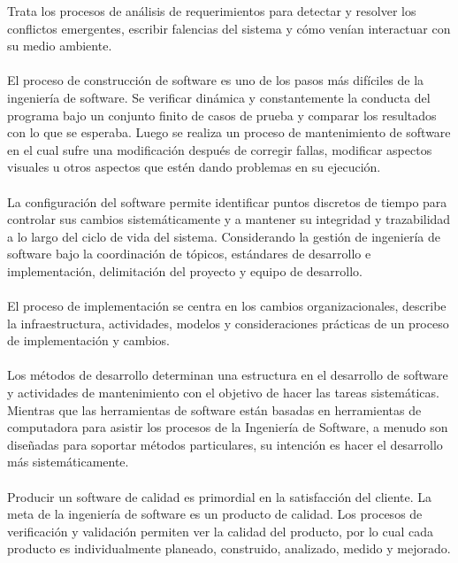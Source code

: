 \documentclass{report}
\begin{document}
Trata los procesos de análisis de requerimientos para detectar y resolver los conflictos emergentes, escribir falencias del sistema y cómo venían interactuar con su medio ambiente.\\ \ \\
El proceso de construcción de software es uno de los pasos más difíciles de la ingeniería de software. Se verificar  dinámica y constantemente la conducta del programa bajo un conjunto finito de casos de prueba y comparar los resultados con lo que se esperaba. Luego se realiza un proceso de mantenimiento de software en el cual sufre una modificación  después de corregir fallas, modificar aspectos visuales u otros aspectos que estén dando problemas en su ejecución. \\ \ \\
La configuración del software permite identificar puntos discretos de tiempo para controlar sus cambios sistemáticamente y a mantener su integridad y trazabilidad a lo largo del ciclo de vida del sistema. Considerando la gestión de ingeniería de software bajo la coordinación de tópicos, estándares de desarrollo e implementación, delimitación del proyecto y equipo de desarrollo.\\ \ \\
El proceso de implementación se centra en los cambios organizacionales, describe la infraestructura, actividades, modelos y consideraciones prácticas de un proceso de implementación y cambios.\\ \ \\
Los métodos de desarrollo determinan una estructura en el desarrollo de software y actividades de mantenimiento con el objetivo de hacer las tareas sistemáticas. Mientras que las herramientas de software están basadas en herramientas de computadora para asistir los procesos de la Ingeniería de Software, a menudo son diseñadas para soportar métodos particulares, su intención es hacer el desarrollo más sistemáticamente.\\ \ \\
Producir un software de calidad es primordial en la satisfacción del cliente. La meta de la ingeniería de software es un producto de calidad. Los procesos de verificación y validación permiten ver la calidad del producto, por lo cual cada producto es individualmente planeado, construido, analizado, medido y mejorado.\\
\end{document}
